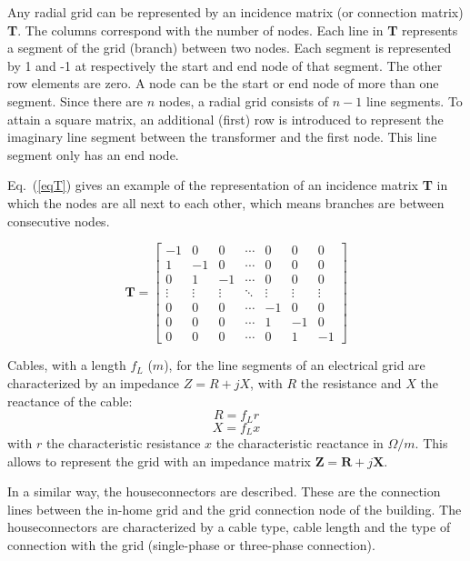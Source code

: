 Any radial grid can be represented by an incidence matrix (or connection matrix) \textbf{T}. The columns correspond with the number of nodes. Each line in \textbf{T} represents a segment of the grid (branch) between two nodes. Each segment is represented by 1 and -1 at respectively the start and end node of that segment. The other row elements are zero. A node can be the start or end node of more than one segment. Since there are $n$ nodes, a radial grid consists of $n-1$ line segments. To attain a square matrix, an additional (first) row is introduced to represent the imaginary line segment between the transformer and the first node. This line segment only has an end node.

Eq.~(\ref{eqT}) gives an example of the representation of an incidence matrix \textbf{T} in which the nodes are all next to each other, which means branches are between
consecutive nodes.

\begin{equation}
\textbf{T} = \begin{bmatrix}
-1 & 0 & 0 & \cdots & 0 & 0 & 0\\
1 & -1 & 0 & \cdots & 0 & 0 & 0\\
0 & 1 & -1 & \cdots & 0 & 0 & 0\\
\vdots & \vdots & \vdots & \ddots & \vdots & \vdots & \vdots\\
0 & 0 & 0 & \cdots & -1 & 0 & 0\\
0 & 0 & 0 & \cdots & 1 & -1 & 0\\
0 & 0 & 0 & \cdots & 0 & 1 & -1
\end{bmatrix}
\label{eqT}
\end{equation}

Cables, with a length $f_L$ ($m$), for the line segments of an electrical grid are characterized by an impedance $Z = R + jX$, with $R$ the resistance and $X$ the reactance of the cable:
\begin{equation}
R = f_L r
\label{eqR}
\end{equation}
\begin{equation}
X = f_L x
\label{eqX}
\end{equation}
with $r$ the characteristic resistance $x$ the characteristic reactance in $\Omega /m$. This allows to represent the grid with an impedance matrix $\textbf{Z} = \textbf{R} + j \textbf{X}$.

In a similar way, the houseconnectors are described. These are the connection lines between the in-home grid and the grid connection node of the building. The houseconnectors are characterized by a cable type, cable length and the type of connection with the grid (\mbox{single-phase} or three-phase connection).


